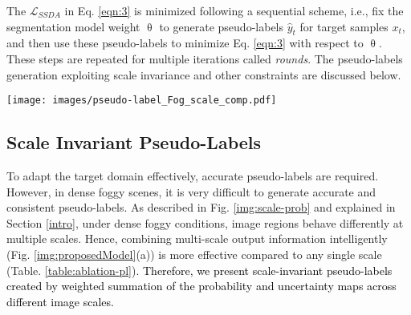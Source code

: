 \documentclass[final,5p,times,twocolumn]{elsarticle}
\begin{document}
The $\mathcal{L}_{SSDA}$ in Eq. \ref{eqn:3} is minimized following a sequential scheme, i.e., fix the segmentation model weight $\uptheta$ to generate pseudo-labels $\hat{y}_t$ for target samples $x_t$, and then use these pseudo-labels to minimize Eq. \ref{eqn:3} with respect to $\uptheta$.
These steps are repeated for multiple iterations called \textit{rounds}.
The pseudo-labels generation exploiting scale invariance and other constraints are discussed below. 







\begin{figure*}[!t]
	\centering
	\texttt{[image: images/pseudo-label\_Fog\_scale\_comp.pdf]}
\caption{
	The proposed FogAdapt framework. 
	(a) Scale-invariant pseudo-labels generation process where, 1) a target image is resized at multiple scales. 2) the resized versions of the image are segmented independently, 3) uncertainty (self-entropy) based weight maps for each image scale are defined and the outputs are weighted respectively 4) the weighted outputs are then resized to the original scale and recombined, and 5) most confident pixels are assigned pseudo-labels. (b) shows the semantic segmentation adaptation using the generated pseudo-labels for target domain images in (a) and the true labels of source domain images simultaneously.  \textcolor{black}{$x_s, y_s, x_t, \text{and} ~\hat{y_t}$ are source image (after translation), source image labels, target image and target image pseudo-labels, respectively. }
	}
	
	\label{img:proposedModel}
\end{figure*}
\subsection{Scale Invariant Pseudo-Labels}
\label{sec:sisc}
To adapt the target domain effectively, accurate pseudo-labels are required. 
However, in dense foggy scenes, it is very difficult to generate accurate and consistent pseudo-labels. 
As described in Fig. \ref{img:scale-prob} and explained in Section \ref{intro}, under dense foggy conditions, image regions behave differently at multiple scales. 
Hence, combining multi-scale output information intelligently (Fig. \ref{img:proposedModel}(a)) is more effective compared to any single scale (Table. \ref{table:ablation-pl}). 
\textcolor{black}{Therefore, we present scale-invariant pseudo-labels created by weighted summation of the probability and uncertainty maps across different image scales.}
\end{document}
